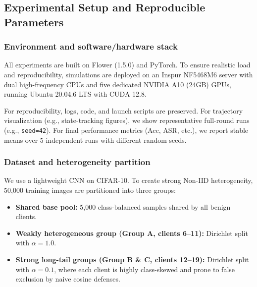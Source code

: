 \documentclass[runningheads]{llncs}
\begin{document}
\subsection{Experimental Setup and Reproducible Parameters}

\subsubsection{Environment and software/hardware stack}
All experiments are built on Flower (1.5.0) and PyTorch. To ensure realistic load and reproducibility, simulations are deployed on an Inspur NF5468M6 server with dual high-frequency CPUs and five dedicated NVIDIA A10 (24GB) GPUs, running Ubuntu 20.04.6 LTS with CUDA 12.8.

For reproducibility, logs, code, and launch scripts are preserved. For trajectory visualization (e.g., state-tracking figures), we show representative full-round runs (e.g., \texttt{seed=42}). For final performance metrics (Acc, ASR, etc.), we report stable means over 5 independent runs with different random seeds.

\subsubsection{Dataset and heterogeneity partition}
We use a lightweight CNN on CIFAR-10. To create strong Non-IID heterogeneity, 50,000 training images are partitioned into three groups:
\begin{itemize}
    \item \textbf{Shared base pool:} 5,000 class-balanced samples shared by all benign clients.
    \item \textbf{Weakly heterogeneous group (Group A, clients 6--11):} Dirichlet split with $\alpha=1.0$.
    \item \textbf{Strong long-tail groups (Group B \& C, clients 12--19):} Dirichlet split with $\alpha=0.1$, where each client is highly class-skewed and prone to false exclusion by naive cosine defenses.
\end{itemize}
\end{document}
